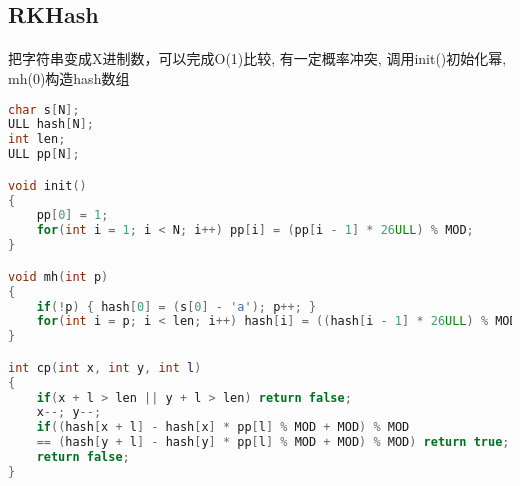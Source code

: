 ﻿\subsection{RKHash}
\paragraph{}
把字符串变成X进制数，可以完成O(1)比较, 有一定概率冲突, 调用init()初始化幂, mh(0)构造hash数组
\begin{lstlisting}[language=C++]
char s[N];
ULL hash[N];
int len;
ULL pp[N];

void init()
{
    pp[0] = 1;
    for(int i = 1; i < N; i++) pp[i] = (pp[i - 1] * 26ULL) % MOD;
}

void mh(int p)
{
    if(!p) { hash[0] = (s[0] - 'a'); p++; }
    for(int i = p; i < len; i++) hash[i] = ((hash[i - 1] * 26ULL) % MOD + (s[i] - 'a')) % MOD;
}

int cp(int x, int y, int l)
{
    if(x + l > len || y + l > len) return false;
    x--; y--;
    if((hash[x + l] - hash[x] * pp[l] % MOD + MOD) % MOD 
	== (hash[y + l] - hash[y] * pp[l] % MOD + MOD) % MOD) return true;
    return false;
}
\end{lstlisting}